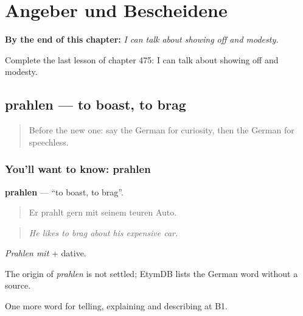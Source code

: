 
\chapter{Angeber und Bescheidene}
\label{ch:ge-angeber-und-bescheidene}

\begin{chapteropening}
\textbf{By the end of this chapter:} \emph{I can talk about showing off and modesty.}

Complete the last lesson of chapter 475: I can talk about showing off and modesty.
\end{chapteropening}

\section[prahlen]{prahlen — to boast, to brag}

\label{lesson:GE-C475-prahlen}



\begin{quote}
Before the new one: say the German for curiosity, then the German for speechless.
\end{quote}

\subsection*{You'll want to know: prahlen}
\textbf{prahlen} — \textquotedblleft{}to boast, to brag\textquotedblright{}.

\begin{quote}
Er prahlt gern mit seinem teuren Auto.
\end{quote}

\begin{quote}
\emph{He likes to brag about his expensive car.}
\end{quote}

\emph{Prahlen mit} + dative.

\begin{cousinweb}
The origin of \emph{prahlen} is not settled; EtymDB lists the German word without a source.
\end{cousinweb}

\begin{grammarlens}[title={What you've built}]
One more word for telling, explaining and describing at B1.
\end{grammarlens}


